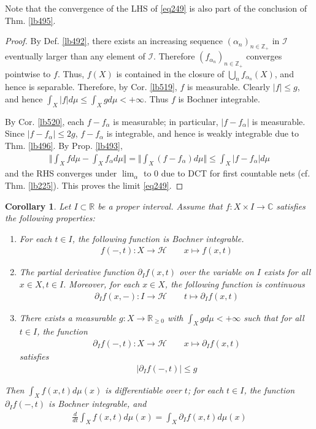 \documentclass[12pt,b5paper,notitlepage]{article}
\theoremstyle{definition}
\theoremstyle{plain}
\newtheorem{co}[df]{Corollary}
\newcommand{\Cbb}{\mathbb C}
\newcommand{\Zbb}{\mathbb Z}
\newcommand{\Rbb}{\mathbb R}
\newcommand{\MH}{\mathcal H}
\newcommand{\SI}{\mathscr I}
\numberwithin{equation}{section}
\begin{document}
\begin{subappendices}
Note that the convergence of the LHS of \eqref{eq249} is also part of the conclusion of Thm. \ref{lb495}.

\begin{proof}
By Def. \ref{lb492}, there exists an increasing sequence $(\alpha_n)_{n\in\Zbb_+}$ in $\SI$ eventually larger than any element of $\SI$. Therefore $(f_{\alpha_n})_{n\in\Zbb_+}$ converges pointwise to $f$. Thus, $f(X)$ is contained in the closure of $\bigcup_n f_{\alpha_n}(X)$, and hence is separable. Therefore, by Cor. \ref{lb519}, $f$ is measurable. Clearly $|f|\leq g$, and hence $\int_X|f|d\mu\leq\int_Xgd\mu<+\infty$. Thus $f$ is Bochner integrable.  

By Cor. \ref{lb520}, each $f-f_\alpha$ is measurable; in particular, $|f-f_\alpha|$ is measurable. Since $|f-f_\alpha|\leq 2g$, $f-f_\alpha$ is integrable, and hence is weakly integrable due to Thm. \ref{lb496}. By Prop. \ref{lb493},
\begin{align*}
\Big\Vert \int_X fd\mu-\int_X f_\alpha d\mu\Big\Vert=\Big\Vert \int_X (f-f_\alpha) d\mu\Big\Vert\leq\int_X|f-f_\alpha|d\mu
\end{align*}
and the RHS converges under $\lim_\alpha$ to $0$ due to DCT for first countable nets (cf. Thm. \ref{lb225}). This proves the limit \eqref{eq249}.
\end{proof}


\begin{co}\label{lb499}
Let $I\subset\Rbb$ be a proper interval. Assume that $f:X\times I\rightarrow\Cbb$ satisfies the following properties:
\begin{enumerate}[label=(\alph*)]
\item For each $t\in I$, the following function is Bochner integrable.
\begin{align*}
f(-,t):X\rightarrow\MH\qquad x\mapsto f(x,t)
\end{align*}
\item The partial derivative function $\partial_If(x,t)$ over the variable on $I$ exists for all $x\in X,t\in I$. Moreover, for each $x\in X$, the following function is continuous
\begin{align*}
\partial_I f(x,-):I\rightarrow\MH\qquad t\mapsto\partial_If(x,t)
\end{align*}
\item There exists a measurable $g:X\rightarrow\Rbb_{\geq0}$ with $\int_Xgd\mu<+\infty$ such that for all $t\in I$, the function
\begin{align*}
\partial_I f(-,t):X\rightarrow\MH\qquad x\mapsto\partial_If(x,t)
\end{align*} 
satisfies
\begin{align*}
|\partial_I f(-,t)|\leq g
\end{align*}
\end{enumerate}
Then $\int_X f(x,t)d\mu(x)$ is differentiable over $t$; for each $t\in I$, the function $\partial_If(-,t)$ is Bochner integrable, and
\begin{align}\label{eq250}
\frac d{dt}\int_X f(x,t)d\mu(x)=\int_X\partial_I f(x,t)d\mu(x)
\end{align}
\end{co}





\end{subappendices}
\end{document}
